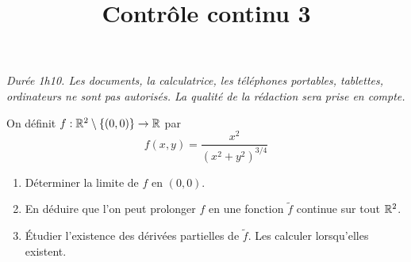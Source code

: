 \documentclass[a4paper]{tp_um}
\title{\large \sffamily\bfseries Contrôle continu 3}
\begin{document}
\maketitle
\textit{Durée 1h10. Les documents, la calculatrice, les téléphones portables, tablettes, ordinateurs ne sont pas autorisés. La qualité de la rédaction sera prise en compte.} 

\bigskip
\bigskip

\exo{} On définit $f:\mathbb{R}^2\setminus\left\{ (0,0) \right\} \to \mathbb{R}$ par 
\[
    f(x,y) = \frac{x^2}{(x^2 + y^2)^{3/4} }
\]
\begin{enumerate}
    \item Déterminer la limite de $f$ en $(0,0)$.
        \blanc{4cm}
        

        

    \item En déduire que l'on peut prolonger $f$ en une fonction $\tilde f$ continue sur tout $\mathbb{R}^2$.
        \blanc{4cm}
        

        

    \item \'Etudier l'existence des dérivées partielles de $\tilde f$. Les calculer lorsqu'elles existent.
        \blanc{13cm}
        

        

\end{enumerate}
\end{document}
